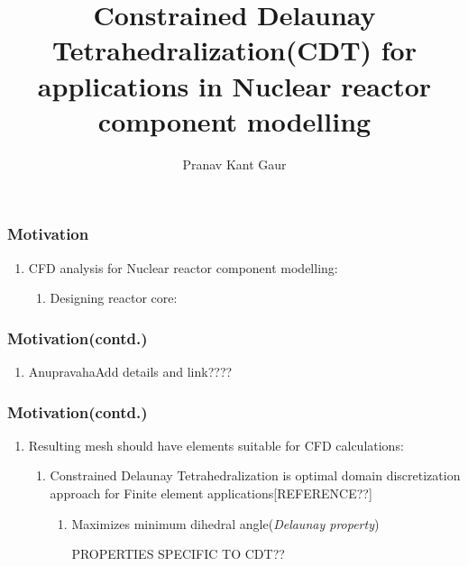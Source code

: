 \documentclass{beamer}
\title[CDT]{Constrained Delaunay Tetrahedralization(CDT) for applications in Nuclear reactor component modelling}
\author{Pranav Kant Gaur}
\institute[BARC, India]{Computer Division, \newline Bhabha Atomic Research Centre, Mumbai, India}
\date{}
\begin{document}
	\begin{frame}
		\titlepage
	\end{frame}	
	\begin{frame}
		\frametitle{Motivation}
			\begin{enumerate}
				\item CFD analysis for Nuclear reactor component modelling:
					\begin{enumerate}
						\item Designing reactor core:
				
					\end{enumerate}		
			\end{enumerate}
	\end{frame}
	\begin{frame}
		\frametitle{Motivation(contd.)}
			\begin{enumerate}
				\item Anupravaha{Add details and link????}
			\end{enumerate}		
	\end{frame}	
	\begin{frame}	
		\frametitle{Motivation(contd.)}	
			\begin{enumerate}
				\item Resulting mesh should have elements suitable for CFD calculations:
					\begin{enumerate}
						\item Constrained Delaunay Tetrahedralization is optimal domain discretization approach for Finite element applications[REFERENCE??]
							\begin{enumerate}
								\item Maximizes minimum dihedral angle(\textit{Delaunay property})
								\item [PROPERTIES SPECIFIC TO CDT??]	
							\end{enumerate}		
					\end{enumerate}		
			\end{enumerate}		
	\end{frame}
\end{document}
